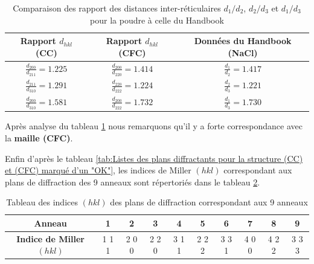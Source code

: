 \begin{table}[h!]
	\centering
	\begin{tabular}{|c|c|c|}
		\hline
		 Rapport $d_{hkl}$ (CC)  &  Rapport $d_{hkl}$ (CFC) &  Données du Handbook (NaCl)\\
		\hline
		 $\frac{d_{200}}{d_{211}} = 1.225 $ & $\frac{d_{200}}{d_{220}} = 1.414 $  & $\frac{d_{1}}{d_{2}} = 1.417 $  \\
		\hline
		 $\frac{d_{211}}{d_{310}} = 1.291 $ & $\frac{d_{220}}{d_{222}} = 1.224 $  & $\frac{d_{2}}{d_{3}} = 1.221 $  \\
		\hline
		 $\frac{d_{200}}{d_{310}} = 1.581 $ & $\frac{d_{200}}{d_{222}} = 1.732 $  & $\frac{d_{1}}{d_{3}} = 1.730 $ \\
		\hline
	\end{tabular}
	\caption{\centering Comparaison des rapport des distances inter-réticulaires $d_1/d_2$, $d_2/d_3$ et $d_1/d_3$ pour la poudre à celle du Handbook}
	\label{tab:Comparaison des rapport des distances inter-réticulaires d1/d2, d2/d3 et d1/d3 pour la poudre à celle du Handbook}
\end{table}




	Après analyse du tableau \ref{tab:Comparaison des rapport des distances inter-réticulaires d1/d2, d2/d3 et d1/d3 pour la poudre à celle du Handbook}  nous remarquons qu'il y a forte correspondance avec la \textbf{maille (CFC)}. 
	

Enfin d'après le tableau \ref{tab:Listes des plans diffractants pour la structure (CC) et (CFC) marqué d’un "OK"}, les indices de Miller $(hkl)$ correspondant aux plans de diffraction des 9 anneaux sont répertoriés dans le tableau \ref{tab:Tableau des plans de diffraction correspondant aux 9 anneaux}.






\begin{table}[h!]
	\centering
	\begin{tabular}{|c|c|c|c|c|c|c|c|c|c|}
		\hline
		\textbf{Anneau}           & 1   & 2   & 3   & 4   & 5   & 6   & 7   & 8   & 9   \\ \hline
		\textbf{Indice de Miller $(hkl)$} & 1 1 1 & 2 0 0 & 2 2 0 & 3 1 1 & 2 2 2 & 3 3 1 & 4 0 0 & 4 2 2 & 3 3 3 \\ \hline
	\end{tabular}
	\caption{Tableau des indices $(hkl)$ des plans de diffraction correspondant aux 9 anneaux}
	\label{tab:Tableau des plans de diffraction correspondant aux 9 anneaux}
\end{table}	




